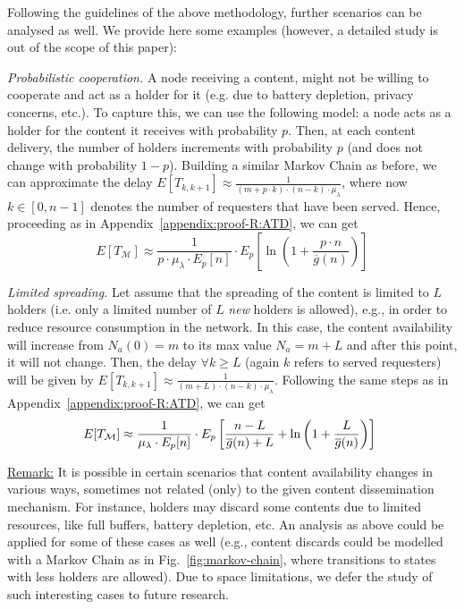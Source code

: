 \documentclass[journal]{IEEEtran}
\newcommand{\revisionRed}[1]{{#1}}\newcommand{\red}[1]{{#1}}
\begin{document}
\red{Following the guidelines of the above methodology, further scenarios can be analysed as well. We provide here some examples (however, a detailed study is out of the scope of this paper):}

\red{\textit{Probabilistic cooperation.} A node receiving a content, might not be willing to cooperate and act as a holder for it (e.g. due to battery depletion, privacy concerns, etc.). To capture this, we can use the following model: a node acts as a holder for the content it receives with probability $p$. Then, at each content delivery, the number of holders increments with probability $p$ (and does not change with probability $1-p$). Building a similar Markov Chain as before, we can approximate the delay $E[T_{k,k+1}] \approx \frac{1}{(m+p\cdot k)\cdot (n-k)\cdot \mu_{\lambda}}$, where now $k\in[0,n-1]$ denotes the number of requesters that have been served. Hence, proceeding as in Appendix~\ref{appendix:proof-R:ATD}, we can get
\begin{equation}
E[T_{\mathcal{M}}]\approx\frac{1}{p\cdot \mu_{\lambda}\cdot E_{p}[n]}\cdot E_{p}\left[\ln\left(1+\frac{p\cdot n}{\overline{g}(n)}\right)\right]\end{equation}}

\red{\textit{Limited spreading.} Let assume that the spreading of the content is limited to $L$ holders (i.e. only a limited number of $L$ \textit{new} holders is allowed), e.g., in order to reduce resource consumption in the network. In this case, the content availability will increase from $N_{a}(0) = m$ to its max value $N_{a} = m+L$ and after this point, it will not change. Then, the delay $\forall k\geq L$ (again $k$ refers to served requesters) will be given by $E[T_{k,k+1}] \approx \frac{1}{(m+L)\cdot (n-k)\cdot \mu_{\lambda}}$. Following the same steps as in  Appendix~\ref{appendix:proof-R:ATD}, we can get
\begin{equation}
~\hspace{-0.25cm}E[T_{\mathcal{M}}]\approx \frac{1}{\mu_{\lambda}\cdot E_{p}[n]}\cdot E_{p}\left[\frac{n-L}{\overline{g}(n)+L}+\ln\left(1+\frac{L}{\overline{g}(n)}\right)\right]\end{equation}
}

\revisionRed{\underline{Remark:} It is possible in certain scenarios that content availability changes in various ways, sometimes not related (only) to the given content dissemination mechanism. For instance, holders may discard some contents due to limited resources, like full buffers, battery depletion, etc. An analysis as above could be applied for some of these cases as well (e.g., content discards could be modelled with a Markov Chain as in Fig.~\ref{fig:markov-chain}, where transitions to states with less holders are allowed). Due to space limitations, we defer the study of such interesting cases to future research.}
\end{document}
